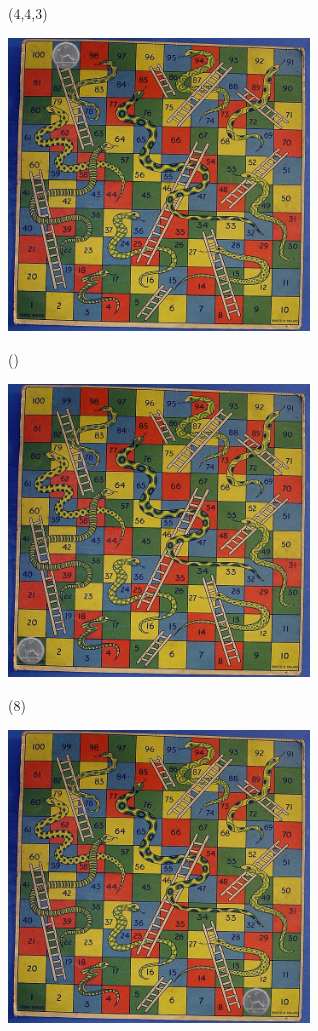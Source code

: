 \documentclass{beamer}
\begin{document}
\begin{frame}{(4,4,3)}
  \begin{center}
    \includegraphics[width=8cm]{game99.jpg}
  \end{center}
    \vfill
\tiny{}
\end{frame}


\begin{frame}{()}
  \begin{center}
    \includegraphics[width=8cm]{game1.jpg}
  \end{center}
    \vfill
\tiny{}
\end{frame}


\begin{frame}{(8)}
  \begin{center}
    \includegraphics[width=8cm]{game9.jpg}
  \end{center}
    \vfill
\tiny{}
\end{frame}
\end{document}

